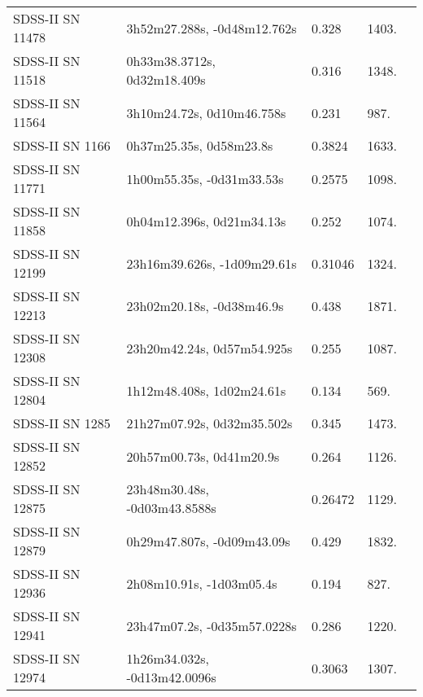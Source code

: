 \begin{longtable}{lllll}
 SDSS-II SN 11478 &    3h52m27.288s, -0d48m12.762s &    0.328 &          1403. &    \citet{2011ApJ...738..162S} \\
 SDSS-II SN 11518 &    0h33m38.3712s, 0d32m18.409s &    0.316 &          1348. &    \citet{2011ApJ...738..162S} \\
 SDSS-II SN 11564 &      3h10m24.72s, 0d10m46.758s &    0.231 &           987. &    \citet{2011ApJ...738..162S} \\
  SDSS-II SN 1166 &        0h37m25.35s, 0d58m23.8s &   0.3824 &          1633. &    \citet{2011ApJ...740...92G} \\
 SDSS-II SN 11771 &      1h00m55.35s, -0d31m33.53s &   0.2575 &          1098. &    \citet{2011ApJ...738..162S} \\
 SDSS-II SN 11858 &      0h04m12.396s, 0d21m34.13s &    0.252 &          1074. &    \citet{2011ApJ...738..162S} \\
 SDSS-II SN 12199 &    23h16m39.626s, -1d09m29.61s &  0.31046 &          1324. &    \citet{2016SDSSD.C...0000:} \\
 SDSS-II SN 12213 &      23h02m20.18s, -0d38m46.9s &    0.438 &          1871. &    \citet{2011ApJ...738..162S} \\
 SDSS-II SN 12308 &     23h20m42.24s, 0d57m54.925s &    0.255 &          1087. &    \citet{2005ApJS..158..161H} \\
 SDSS-II SN 12804 &      1h12m48.408s, 1d02m24.61s &    0.134 &           569. &    \citet{2010ApJ...713.1026D} \\
  SDSS-II SN 1285 &     21h27m07.92s, 0d32m35.502s &    0.345 &          1473. &    \citet{2011ApJ...738..162S} \\
 SDSS-II SN 12852 &       20h57m00.73s, 0d41m20.9s &    0.264 &          1126. &    \citet{2010ApJ...713.1026D} \\
 SDSS-II SN 12875 &   23h48m30.48s, -0d03m43.8588s &  0.26472 &          1129. &    \citet{2016SDSSD.C...0000:} \\
 SDSS-II SN 12879 &     0h29m47.807s, -0d09m43.09s &    0.429 &          1832. &    \citet{2011ApJ...738..162S} \\
 SDSS-II SN 12936 &       2h08m10.91s, -1d03m05.4s &    0.194 &           827. &    \citet{2010ApJ...713.1026D} \\
 SDSS-II SN 12941 &    23h47m07.2s, -0d35m57.0228s &    0.286 &          1220. &    \citet{2011ApJ...738..162S} \\
 SDSS-II SN 12974 &   1h26m34.032s, -0d13m42.0096s &   0.3063 &          1307. &    \citet{2016SDSSD.C...0000:} \\

\end{longtable}
